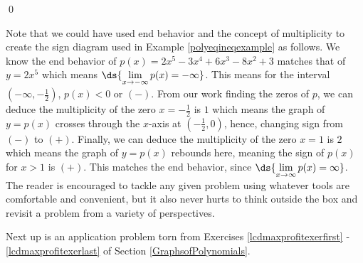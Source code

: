 \documentclass{ximera}
\begin{document}
\begin{example}
\begin{enumerate}
\begin{center}
\end{center} 

\qed
\end{enumerate}

\end{example}

Note that we could have used end behavior and the concept of multiplicity to create the sign diagram used in Example \ref{polyeqineqexample} as follows.  We know the end behavior of $p(x) = 2x^5-3x^4+6x^3-8x^2+3$ matches that of $y = 2x^5$ which means $\ds{\lim_{x \rightarrow -\infty} p(x) = -\infty}$.  This means for the interval $\left(-\infty, -\frac{1}{2}\right)$, $p(x) < 0$ or $(-)$. From our work finding the zeros of $p$, we can deduce the multiplicity of the zero $x = -\frac{1}{2}$ is $1$ which means the graph of $y = p(x)$ crosses through the $x$-axis at $\left( -\frac{1}{2}, 0 \right)$, hence, changing sign from $(-)$ to $(+)$.  Finally, we can deduce the multiplicity of the zero $x = 1$ is $2$ which means the graph of $y = p(x)$ rebounds here, meaning the sign of $p(x)$ for $x > 1$ is $(+)$.  This matches the end behavior, since $\ds{\lim_{x \rightarrow \infty} p(x) = \infty}$.  The reader is encouraged to tackle any given problem using whatever tools are comfortable and convenient, but it also never hurts to think outside the box and revisit a problem from a variety of perspectives.

Next up is an application problem torn from Exercises \ref{lcdmaxprofitexerfirst} - \ref{lcdmaxprofitexerlast} of Section \ref{GraphsofPolynomials}.
\end{document}
